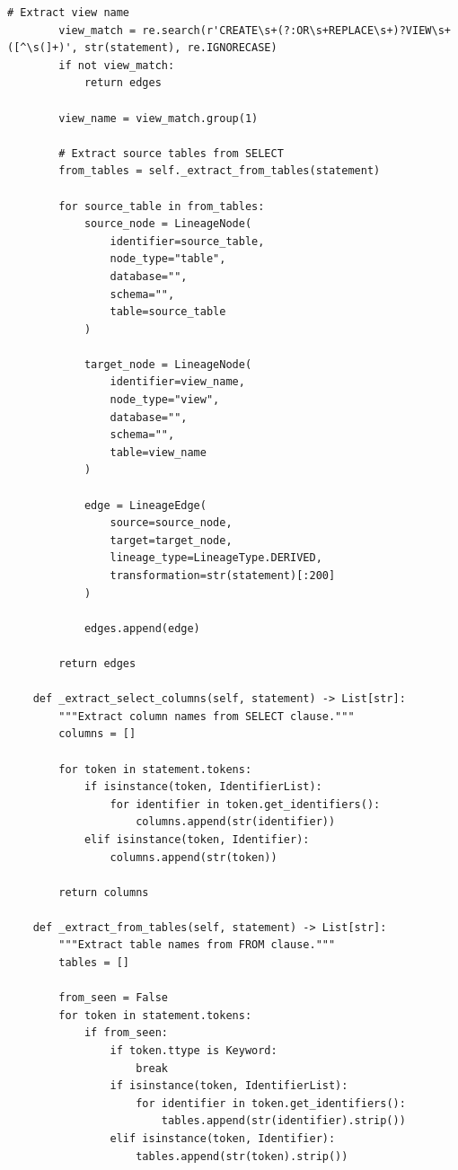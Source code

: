 \begin{lstlisting}[style=python, caption=LineageTracker with Column-Level Dependencies]
        # Extract view name
        view_match = re.search(r'CREATE\s+(?:OR\s+REPLACE\s+)?VIEW\s+([^\s(]+)', str(statement), re.IGNORECASE)
        if not view_match:
            return edges

        view_name = view_match.group(1)

        # Extract source tables from SELECT
        from_tables = self._extract_from_tables(statement)

        for source_table in from_tables:
            source_node = LineageNode(
                identifier=source_table,
                node_type="table",
                database="",
                schema="",
                table=source_table
            )

            target_node = LineageNode(
                identifier=view_name,
                node_type="view",
                database="",
                schema="",
                table=view_name
            )

            edge = LineageEdge(
                source=source_node,
                target=target_node,
                lineage_type=LineageType.DERIVED,
                transformation=str(statement)[:200]
            )

            edges.append(edge)

        return edges

    def _extract_select_columns(self, statement) -> List[str]:
        """Extract column names from SELECT clause."""
        columns = []

        for token in statement.tokens:
            if isinstance(token, IdentifierList):
                for identifier in token.get_identifiers():
                    columns.append(str(identifier))
            elif isinstance(token, Identifier):
                columns.append(str(token))

        return columns

    def _extract_from_tables(self, statement) -> List[str]:
        """Extract table names from FROM clause."""
        tables = []

        from_seen = False
        for token in statement.tokens:
            if from_seen:
                if token.ttype is Keyword:
                    break
                if isinstance(token, IdentifierList):
                    for identifier in token.get_identifiers():
                        tables.append(str(identifier).strip())
                elif isinstance(token, Identifier):
                    tables.append(str(token).strip())


\end{lstlisting}
